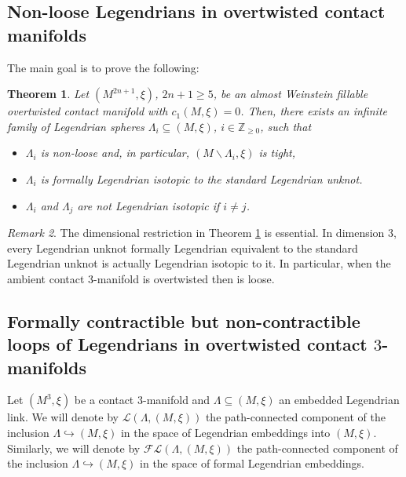 \documentclass[11pt]{amsart}
\theoremstyle{plain}
\newtheorem{theorem}{Theorem}
\theoremstyle{definition}
\theoremstyle{remark}
\newtheorem{remark}[theorem]{Remark}
\numberwithin{theorem}{section}
\newcommand{\Z}{\mathbb{Z}}           %
\renewcommand{\L}{\mathcal{L}}           %
\newcommand{\FL}{\mathcal{FL}}           %
\begin{document}
\subsection{Non-loose Legendrians in overtwisted contact manifolds}

The main goal is to prove the following: 

\begin{theorem}\label{thm:NonLoose}
Let $(M^{2n+1},\xi)$, $2n+1\geq 5$, be an almost Weinstein fillable overtwisted contact manifold with $c_1(M,\xi)=0$. Then, there exists an infinite family of Legendrian spheres $\Lambda_i\subseteq (M,\xi)$, $i\in \Z_{\geq0}$, such that
\begin{itemize}
    \item [(a)] $\Lambda_i$ is non-loose and, in particular, $(M\backslash \Lambda_i,\xi)$ is tight, 
    
    \item [(b)] $\Lambda_i$ is formally Legendrian isotopic to the standard Legendrian unknot.
    
    \item [(c)] $\Lambda_i$ and $\Lambda_j$ are not Legendrian isotopic if $i\neq j$. 
    
\end{itemize}
\end{theorem}

\begin{remark}
    The dimensional restriction in Theorem \ref{thm:NonLoose} is essential. In dimension $3$, every Legendrian unknot formally Legendrian equivalent to the standard Legendrian unknot is actually Legendrian isotopic to it. In particular, when the ambient contact $3$-manifold is overtwisted then is loose. 
\end{remark}

\subsection{Formally contractible but non-contractible loops of Legendrians in overtwisted contact $3$-manifolds}

Let $(M^3,\xi)$ be a contact $3$-manifold and $\Lambda\subseteq (M,\xi)$ an embedded Legendrian link. We will denote by $\L(\Lambda,(M,\xi))$ the path-connected component of the inclusion $\Lambda\hookrightarrow (M,\xi)$ in the space of Legendrian embeddings into $(M,\xi)$. Similarly, we will denote by $\FL(\Lambda,(M,\xi))$ the path-connected component of the inclusion $\Lambda\hookrightarrow (M,\xi)$ in the space of formal Legendrian embeddings. 
\end{document}
